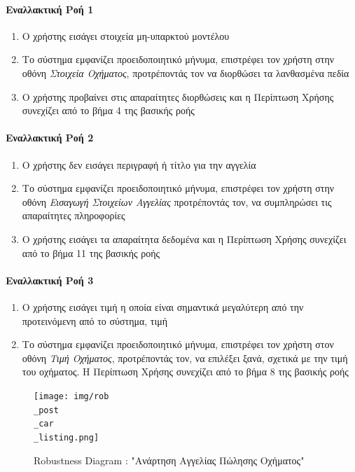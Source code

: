 \documentclass{../ol-softwaremanual}
\begin{document}
	\paragraph{Εναλλακτική Ροή 1}
	
	\begin{enumerate}
		\item O χρήστης εισάγει στοιχεία μη-υπαρκτού μοντέλου
		\item Το σύστημα εμφανίζει προειδοποιητικό μήνυμα, επιστρέφει τον χρήστη στην οθόνη \textit{Στοιχεία Οχήματος}, προτρέποντάς τον να διορθώσει τα λανθασμένα πεδία
		\item Ο χρήστης προβαίνει στις απαραίτητες διορθώσεις και η Περίπτωση Χρήσης συνεχίζει από το βήμα 4 της βασικής ροής
	\end{enumerate}
	
	\paragraph{Εναλλακτική Ροή 2}
	
	\begin{enumerate}
		\item Ο χρήστης δεν εισάγει περιγραφή ή τίτλο για την αγγελία
		\item Το σύστημα εμφανίζει προειδοποιητικό μήνυμα, επιστρέφει τον χρήστη στην οθόνη \textit{Εισαγωγή Στοιχείων Αγγελίας} προτρέποντάς τον, να συμπληρώσει τις απαραίτητες πληροφορίες
		\item Ο χρήστης εισάγει τα απαραίτητα δεδομένα και η Περίπτωση Χρήσης συνεχίζει από το βήμα 11 της βασικής ροής
	\end{enumerate}
	
	\paragraph{Εναλλακτική Ροή 3}
	
	\begin{enumerate}
		\item Ο χρήστης εισάγει τιμή η οποία είναι σημαντικά μεγαλύτερη από την προτεινόμενη από το σύστημα, τιμή
		\item Το σύστημα εμφανίζει προειδοποιητικό μήνυμα, επιστρέφει τον χρήστη στον οθόνη \textit{Τιμή Οχήματος}, προτρέποντάς τον, να επιλέξει ξανά, σχετικά με την τιμή του οχήματος. Η Περίπτωση Χρήσης συνεχίζει από το βήμα 8 της βασικής ροής
	\end{enumerate}
	
	\newpage 
	\begin{figure}[htbp!]
		\texttt{[image: img/rob\\\_post\\\_car\\\_listing.png]}
		\caption{\en Robustness Diagram : "\gr Ανάρτηση Αγγελίας Πώλησης Οχήματος\en"\gr\protect\footnotemark[1]}
	\end{figure}
	
\end{document}
